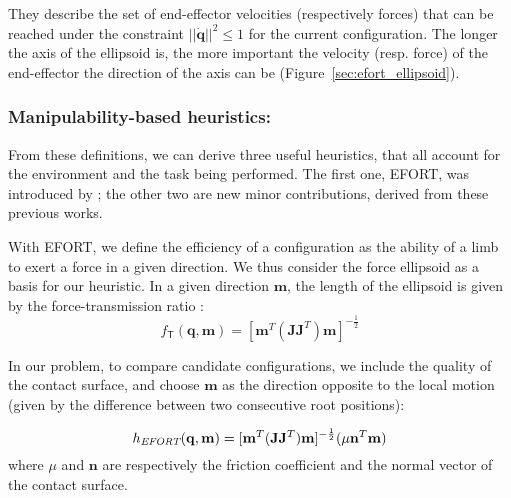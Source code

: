 They describe the set of end-effector velocities (respectively forces) that can
be reached under the constraint $||\dot{\mathbf{q}}||^2 \leq 1$ for the current configuration.
The longer the axis of the ellipsoid is, the more important the velocity (resp. force) of the end-effector the direction of the axis can be (Figure~\ref{sec:efort_ellipsoid}).
 
 

\subsubsection{Manipulability-based heuristics:}
From these definitions, we can derive three useful heuristics, that all account for the environment and the task being performed.
The first one, EFORT, was introduced by \cite{Tonneau2014}; the other two are new minor contributions, derived from these previous works.

With EFORT, we define the efficiency of a configuration as the ability of a limb to exert a force in a given direction.
We thus consider the force ellipsoid as a basis for our heuristic.
In a given direction $\mathbf{m}$, the length of the ellipsoid is given by the force-transmission ratio \citep{1087795}:
\begin{equation*}
f_\mathsf{T}(\mathbf{q}, \mathbf{m}) = [\mathbf{m}^{T}(\mathbf{J}\mathbf{J}	^{T})\mathbf{m}]^{-\frac{1}{2}}
\end{equation*}

In our problem, to compare candidate configurations, we include the quality of the contact surface, and choose $\mathbf{m}$ as the direction
opposite to the local motion (given by the difference between two consecutive root positions):

\begin{equation}
h_{\textrm{\it EFORT}}(\mathbf{q}, \mathbf{m}) = [\mathbf{m}^{T}(\mathbf{J}\mathbf{J}^T)\mathbf{m}]^{-\frac{1}{2}} ( \mu \mathbf{n}^T \mathbf{m})
\end{equation}
where $\mu$ and $\mathbf{n}$ are respectively the friction coefficient and the normal vector of the contact surface.


